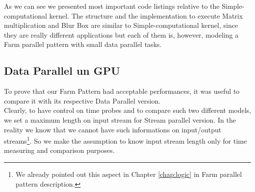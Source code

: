 	As we can see we presented most important code listings relative to the Simple-computational kernel. The structure and the implementation to execute Matrix multiplication and Blur Box are similar to Simple-computational kernel, since they are really different applications but each of them is, however, modeling a Farm parallel pattern with small data parallel tasks.

\subsection{Data Parallel un GPU}
	To prove that our Farm Pattern had acceptable performances, it was useful to compare it with its respective Data Parallel version.\\
	Clearly, to have control on time probes and to compare such two different models, we set a maximum length on input stream for Stream parallel version. In the reality we know that we cannot have such informations on input/output streams\footnote{We already pointed out this aspect in Chapter \ref{chap:logic} in Farm parallel pattern description.}. So we make the assumption to know input stream length only for time measuring and comparison purposes.
	
